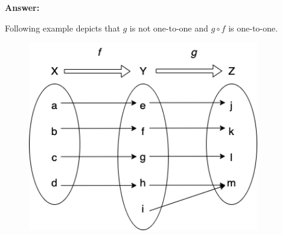 \documentclass[14pt]{extreport}
\newcommand{\answer}[0]{\medskip \textbf{Answer:} \medskip}
\begin{document}
\begin{enumerate}
        \answer
        
        Following example depicts that $g$ is not one-to-one and $g \circ f$ is one-to-one. \\
        \begin{figure}[htp]
            \centering
            \includegraphics[width=10cm]{VennDiagramQ11.png}
        \end{figure}
    
\end{enumerate}
\newpage
	
\end{document}

